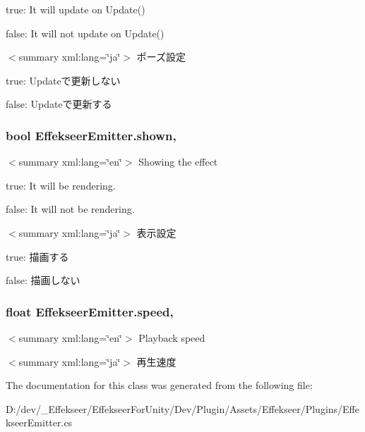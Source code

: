 true\-: It will update on Update()

false\-: It will not update on Update()

$<$summary xml\-:lang=\char`\"{}ja\char`\"{}$>$ ポーズ設定 

true\-: Updateで更新しない

false\-: Updateで更新する\hypertarget{class_effekseer_emitter_a8beed88f3cb7357c4eb088847a6d1fbc}{
\subsubsection[{shown}]{\setlength{\rightskip}{0pt plus 5cm}bool Effekseer\-Emitter.\-shown\hspace{0.3cm}{\ttfamily [get]}, {\ttfamily [set]}}}\label{class_effekseer_emitter_a8beed88f3cb7357c4eb088847a6d1fbc}
$<$summary xml\-:lang=\char`\"{}en\char`\"{}$>$ Showing the effect 

true\-: It will be rendering.

false\-: It will not be rendering.

$<$summary xml\-:lang=\char`\"{}ja\char`\"{}$>$ 表示設定 

true\-: 描画する

false\-: 描画しない\hypertarget{class_effekseer_emitter_ab7aec861ddf0ae032b485f7103d9779d}{
\subsubsection[{speed}]{\setlength{\rightskip}{0pt plus 5cm}float Effekseer\-Emitter.\-speed\hspace{0.3cm}{\ttfamily [get]}, {\ttfamily [set]}}}\label{class_effekseer_emitter_ab7aec861ddf0ae032b485f7103d9779d}
$<$summary xml\-:lang=\char`\"{}en\char`\"{}$>$ Playback speed 

$<$summary xml\-:lang=\char`\"{}ja\char`\"{}$>$ 再生速度 

The documentation for this class was generated from the following file\-:\begin{DoxyCompactItemize}
\item 
D\-:/dev/\-\_\-\-Effekseer/\-Effekseer\-For\-Unity/\-Dev/\-Plugin/\-Assets/\-Effekseer/\-Plugins/Effekseer\-Emitter.\-cs\end{DoxyCompactItemize}
